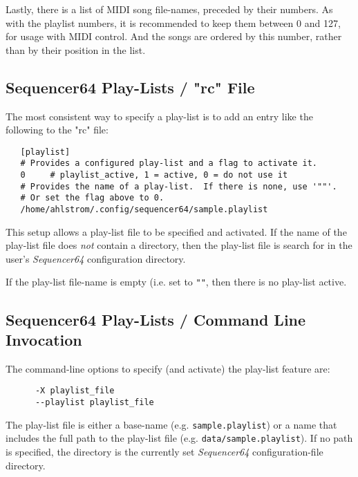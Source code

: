    Lastly, there is a list of MIDI song file-names, preceded by their numbers.
   As with the playlist numbers, it is recommended to keep them between 0 and
   127, for usage with MIDI control.  And the songs are ordered by this number,
   rather than by their position in the list.

\subsection{Sequencer64 Play-Lists / "rc" File}
\label{subsec:playlist_rc_file}

   The most consistent way to specify a play-list is to add an entry like the
   following to the "rc" file:

   \begin{verbatim}
   [playlist]
   # Provides a configured play-list and a flag to activate it.
   0     # playlist_active, 1 = active, 0 = do not use it
   # Provides the name of a play-list.  If there is none, use '""'.
   # Or set the flag above to 0.
   /home/ahlstrom/.config/sequencer64/sample.playlist
   \end{verbatim}

   This setup allows a play-list file to be specified and activated.
   If the name of the play-list file does \textsl{not} contain a directory,
   then the play-list file is search for in the user's \textsl{Sequencer64}
   configuration directory.

   If the play-list file-name is empty (i.e. set to \texttt{""}, then there is
   no play-list active.

\subsection{Sequencer64 Play-Lists / Command Line Invocation}
\label{subsec:playlist_cmd_line}

   The command-line options to specify (and activate) the play-list feature
   are:

   \begin{verbatim}
      -X playlist_file
      --playlist playlist_file
   \end{verbatim}

   The play-list file is either a base-name (e.g. \texttt{sample.playlist})
   or a name that includes the full path to the play-list file
   (e.g. \texttt{data/sample.playlist}).
   If no path is specified, the directory is the currently set
   \textsl{Sequencer64} configuration-file directory.


